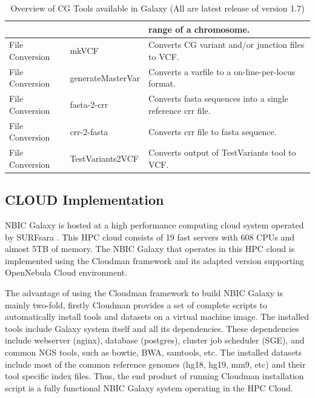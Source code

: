 \begin{table}
\begin{tabular}{l|l|l}
                  &              & range of a chromosome. \\ \hline
File Conversion   & mkVCF        & Converts CG variant and/or junction files to VCF. \\ \hline
File Conversion   & generateMasterVar & Converts a varfile to a on-line-per-locus format. \\ \hline
File Conversion   & fasta-2-crr  & Converts fasta sequences into a single reference crr file. \\ \hline
File Conversion   & crr-2-fasta  & Converts crr file to fasta sequence. \\ \hline
File Conversion   & TestVariants2VCF & Converts output of TestVariants tool to VCF. \\
\end{tabular}
\caption{Overview of CG Tools available in Galaxy (All are latest release of version 1.7)}
\label{table:tools}
\end{table}
\normalsize

\subsection*{CLOUD Implementation}

NBIC Galaxy is hosted at a high performance computing cloud system operated by SURFsara \cite{url-surfsara}. This HPC cloud consists of 19 fast servers with 608 CPUs and almost 5TB of memory. The NBIC Galaxy that operates in this HPC cloud is implemented using the Cloudman framework \cite{afgan} and its adapted version supporting OpenNebula Cloud environment.

The advantage of using the Cloudman framework to build NBIC Galaxy is mainly two-fold, firstly  Cloudman provides a set of complete scripts to automatically install tools and datasets on a virtual machine image. The installed tools include Galaxy system itself and all its dependencies. These dependencies include webserver (nginx), database (postgres), cluster job scheduler (SGE), and common NGS tools, such as bowtie, BWA, samtools, etc. The installed datasets include most of the common reference genomes (hg18, hg19, mm9, etc) and their tool specific index files. Thus, the end product of running Cloudman installation script is a fully functional NBIC Galaxy system operating in the HPC Cloud.



